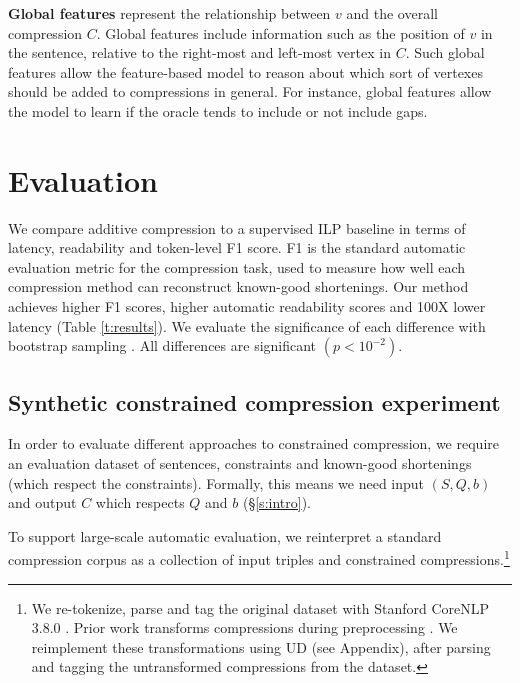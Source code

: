 \documentclass[11pt,a4paper]{article}
\begin{document}
\textbf{Global features} represent the relationship between $v$ and the overall compression $C$. Global features include information such as the position of $v$ in the sentence, relative to the right-most and left-most vertex in $C$. Such global features allow the feature-based model to reason about which sort of vertexes should be added to compressions in general. For instance, global features allow the model to learn if the oracle tends to include or not include gaps.

\section{Evaluation}\label{s:autoeval}

We compare additive compression to a supervised ILP baseline in terms of latency, readability and token-level F1 score. F1 is the standard automatic evaluation metric for the compression task, used to measure how well each compression method can reconstruct known-good shortenings. Our method achieves higher F1 scores, higher automatic readability scores and 100X lower latency (Table \ref{t:results}). We evaluate the significance of each difference with bootstrap sampling \cite{D12-1091}. All differences are significant {\small $(p < 10^{-2})$}. 

\subsection{Synthetic constrained compression experiment}

In order to evaluate different approaches to constrained compression, we require an evaluation dataset of sentences, constraints and known-good shortenings (which respect the constraints). Formally, this means we need input $(S, Q, b)$ and output $C$ which respects $Q$ and $b$ (\S\ref{s:intro}).

To support large-scale automatic evaluation, we reinterpret a standard compression corpus \cite{filippova2013overcoming}
as a collection of input triples and constrained compressions.\footnote{We re-tokenize, parse and tag the original dataset with Stanford CoreNLP 3.8.0 \cite{corenlp}. Prior work transforms compressions during preprocessing \cite{filippova2013overcoming}. We reimplement these transformations using UD (see Appendix), after parsing and tagging the untransformed compressions from the dataset.}
\end{document}
